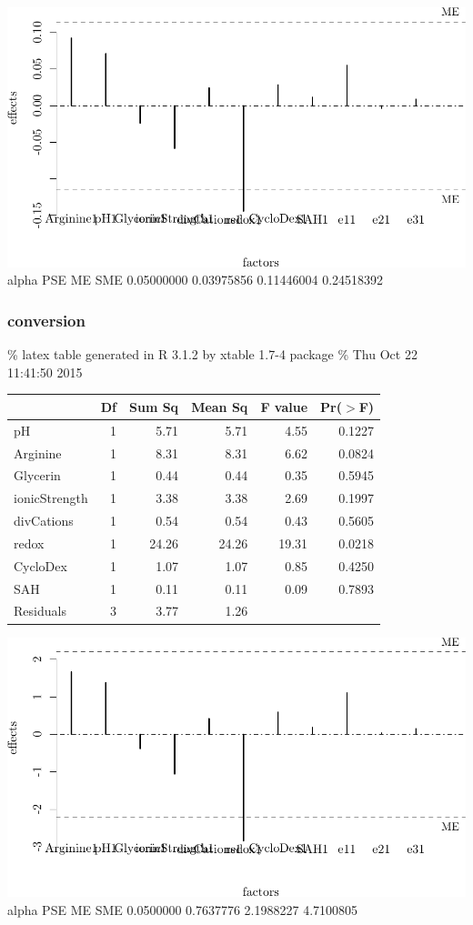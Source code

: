 \documentclass[]{article}
\begin{document}
\includegraphics{analysis_files/figure-latex/unnamed-chunk-13-1.pdf}
alpha PSE ME SME 0.05000000 0.03975856 0.11446004 0.24518392

\subsubsection{conversion}\label{conversion-1}

\% latex table generated in R 3.1.2 by xtable 1.7-4 package \% Thu Oct
22 11:41:50 2015

\begin{table}[ht]
\centering
\begin{tabular}{lrrrrr}
  \hline
 & Df & Sum Sq & Mean Sq & F value & Pr($>$F) \\ 
  \hline
pH            & 1 & 5.71 & 5.71 & 4.55 & 0.1227 \\ 
  Arginine      & 1 & 8.31 & 8.31 & 6.62 & 0.0824 \\ 
  Glycerin      & 1 & 0.44 & 0.44 & 0.35 & 0.5945 \\ 
  ionicStrength & 1 & 3.38 & 3.38 & 2.69 & 0.1997 \\ 
  divCations    & 1 & 0.54 & 0.54 & 0.43 & 0.5605 \\ 
  redox         & 1 & 24.26 & 24.26 & 19.31 & 0.0218 \\ 
  CycloDex      & 1 & 1.07 & 1.07 & 0.85 & 0.4250 \\ 
  SAH           & 1 & 0.11 & 0.11 & 0.09 & 0.7893 \\ 
  Residuals     & 3 & 3.77 & 1.26 &  &  \\ 
   \hline
\end{tabular}
\end{table}

\includegraphics{analysis_files/figure-latex/unnamed-chunk-14-1.pdf}
alpha PSE ME SME 0.0500000 0.7637776 2.1988227 4.7100805
\end{document}
